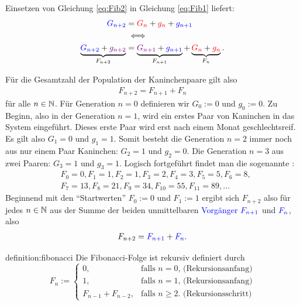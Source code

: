 \noindent
Einsetzen von Gleichung \ref{eq:Fib2} in Gleichung \ref{eq:Fib1} liefert:
\begin{align*}
    \textcolor{Blue}{G_{n+2}} &= \textcolor{Red}{G_{n}} + \textcolor{Red}{g_{n}} + \textcolor{Blue}{g_{n+1}} \\
    &\iff \\
    \underbrace{\textcolor{Blue}{G_{n+2}} + \textcolor{Purple}{g_{n+2}}}_{F_{n+2}} &= \underbrace{\textcolor{Purple}{G_{n+1}} + \textcolor{Blue}{g_{n+1}}}_{F_{n+1}} + \underbrace{\textcolor{Red}{G_{n}} + \textcolor{Red}{g_{n}}}_{F_n}.
\end{align*}

\noindent
Für die Gesamtzahl der Population der Kaninchenpaare gilt also
\begin{align*}
    F_{n+2} = F_{n+1} + F_{n}
\end{align*}
für alle $n\in\mathbb{N}$. Für Generation $n=0$ definieren wir $G_0:=0$ und $g_0:=0$. Zu Beginn, also in der Generation $n=1$, wird ein erstes Paar von Kaninchen in das System eingeführt. Dieses erste Paar wird erst nach einem Monat geschlechtsreif. Es gilt also $G_1=0$ und $g_1=1$. Somit besteht die Generation $n=2$ immer noch aus nur einem Paar Kaninchen: $G_2=1$ und $g_2=0$. Die Generation $n=3$ aus zwei Paaren: $G_3=1$ und $g_3=1$. Logisch fortgeführt findet man die sogenannte :
\begin{align*}
    &F_0 = 0, F_1 = 1, F_2 = 1, F_3 = 2, F_4 = 3, F_5 = 5, F_6 = 8,\\
    &F_7 = 13, F_8 = 21, F_9 = 34, F_{10} = 55, F_{11} = 89, \ldots
\end{align*}
Beginnend mit den \enquote{Startwerten} $F_0 := 0$ und  $F_1 := 1$ ergibt sich $F_{n+2}$ also für jedes $n\in\mathbb{N}$ aus der Summe der beiden unmittelbaren \textcolor{Blue}{Vorgänger} $\textcolor{Blue}{F_{n+1}}$ und $\textcolor{Blue}{F_{n}}$, also
\begin{align*}
    F_{n+2} = \textcolor{Blue}{F_{n+1}} + \textcolor{Blue}{F_{n}}.
\end{align*}
\begin{definition}{definition:fibonacci}
Die Fibonacci-Folge ist rekursiv definiert durch
\[
  F_n := 
  \begin{cases}
    0, &\text{falls $n=0$, (Rekursionsanfang)} \\
    1, &\text{falls $n=1$, (Rekursionsanfang)} \\
    F_{n-1} + F_{n-2}, & \text{falls  $n\geq 2$. (Rekursionsschritt)}
  \end{cases}
\]
\end{definition}
